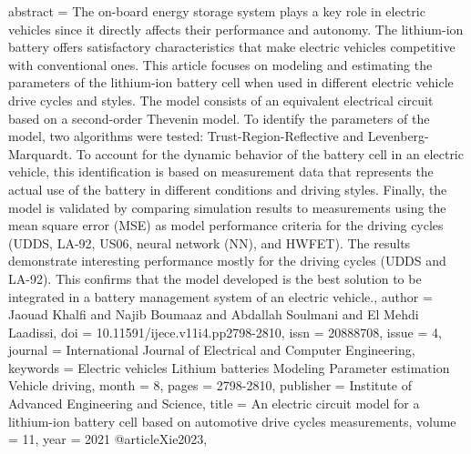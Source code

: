 {{{{{{{{{{   abstract = {The on-board energy storage system plays a key role in electric vehicles since it directly affects their performance and autonomy. The lithium-ion battery offers satisfactory characteristics that make electric vehicles competitive with conventional ones. This article focuses on modeling and estimating the parameters of the lithium-ion battery cell when used in different electric vehicle drive cycles and styles. The model consists of an equivalent electrical circuit based on a second-order Thevenin model. To identify the parameters of the model, two algorithms were tested: Trust-Region-Reflective and Levenberg-Marquardt. To account for the dynamic behavior of the battery cell in an electric vehicle, this identification is based on measurement data that represents the actual use of the battery in different conditions and driving styles. Finally, the model is validated by comparing simulation results to measurements using the mean square error (MSE) as model performance criteria for the driving cycles (UDDS, LA-92, US06, neural network (NN), and HWFET). The results demonstrate interesting performance mostly for the driving cycles (UDDS and LA-92). This confirms that the model developed is the best solution to be integrated in a battery management system of an electric vehicle.},
   author = {Jaouad Khalfi and Najib Boumaaz and Abdallah Soulmani and El Mehdi Laadissi},
   doi = {10.11591/ijece.v11i4.pp2798-2810},
   issn = {20888708},
   issue = {4},
   journal = {International Journal of Electrical and Computer Engineering},
   keywords = {Electric vehicles Lithium batteries Modeling Parameter estimation Vehicle driving},
   month = {8},
   pages = {2798-2810},
   publisher = {Institute of Advanced Engineering and Science},
   title = {An electric circuit model for a lithium-ion battery cell based on automotive drive cycles measurements},
   volume = {11},
   year = {2021}
}
@article{Xie2023,
}}}}}}}}}}
